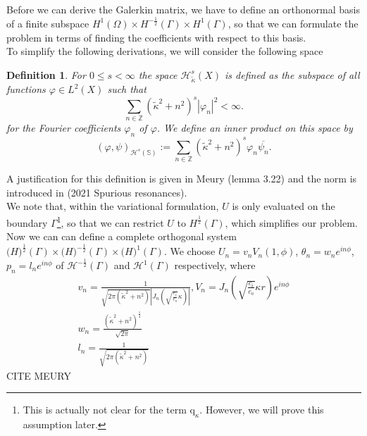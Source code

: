 \documentclass[10pt,journal,compsoc, onecolumn]{IEEEtran}
\newtheorem{definition}[theorem]{Definition}
\begin{document}
Before we can derive the Galerkin matrix, we have to define an orthonormal basis of a finite subspace $H^{1}(\Omega)\times H^{-\frac{1}{2}}(\Gamma) \times H^1(\Gamma)$, 
so that we can formulate the problem in terms of finding the coefficients with respect to this basis. \\ 
To simplify the following derivations, we will consider the following space 
\begin{definition} 
    For \(0 \leq s<\infty\) the space \(\mathcal{H}^{s}_{\tilde \kappa}(X)\) is defined as the subspace of all functions $\varphi \in L^{2}(X)$
    such that
    $$
    \sum_{n \in \mathbb{Z}}\left(\tilde \kappa^2+n^{2}\right)^{s}\left|\varphi_{n}\right|^{2}<\infty. 
    $$
    for the Fourier coefficients \(\varphi_{n}\) of \(\varphi\). We define an inner product on this space by
    $$
    (\varphi, \psi)_{\mathcal{H}^{s}(\mathbb{S})}:=\sum_{n \in \mathbb{Z}}\left(\tilde \kappa^2+n^{2}\right)^{s} \varphi_{n} \overline{\psi_{n}}.
    $$
\end{definition}
A justification for this definition is given in Meury (lemma 3.22) and the norm is introduced in (2021 Spurious resonances).
\\
We note that, within the variational formulation, $U$ is only evaluated on the boundary $\Gamma$\footnote{This is actually not clear for the term $\mathrm{q}_{\kappa}$. However, we will prove this assumption later.}, 
so that we can restrict $U$ to $H^{\frac{1}{2}}(\Gamma)$, which simplifies our problem. \\
Now we can can define a complete orthogonal system $\mathcal(H)^{\frac{1}{2}}(\Gamma) \times \mathcal(H)^{-\frac{1}{2}}(\Gamma) \times \mathcal(H)^{1}(\Gamma)$. 
We choose $U_{n}=v_{n} V_{n}(1, \phi)$, $\theta_{n}=w_{n} e^{i n \phi}$, $p_{n}=l_{n} e^{i n \phi}$ 
of \(\mathcal{H}^{-\frac{1}{2}}(\Gamma)\) and \(\mathcal{H}^{1}(\Gamma)\) respectively, where
\begin{align} 
    v_{n}=\frac{1}{\sqrt{2 \pi\left(\tilde \kappa^2+n^{2}\right)}\left|J_{n}\left(\sqrt{\frac{c_{i}}{c_{o}}} \kappa\right)\right|}, V_{n}=J_{n}\left(\sqrt{\frac{c_{i}}{c_{o}}} \kappa r\right) e^{i n \phi} \nonumber \\
    w_{n}=\frac{\left(\tilde \kappa^2+n^{2}\right)^{\frac{1}{4}}}{\sqrt{2 \pi}} \label{eq:coefficients}\\
    l_{n}=\frac{1}{\sqrt{2 \pi\left(\tilde \kappa^2+n^{2}\right)}} \nonumber
\end{align}
CITE MEURY 
\end{document}
